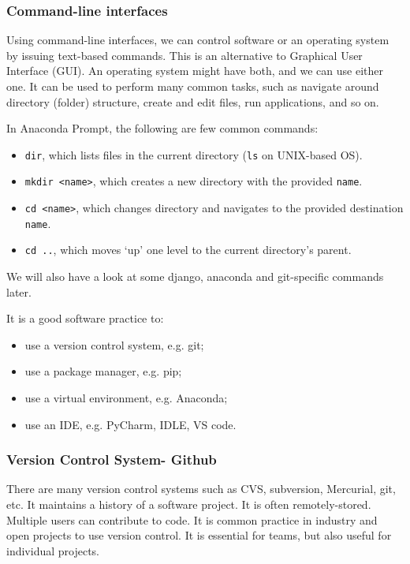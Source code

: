 \documentclass[a4paper, openany]{memoir}
\begin{document}
    \subsubsection{Command-line interfaces}
    Using command-line interfaces, we can control software or an operating system by issuing text-based commands. This is an alternative to Graphical User Interface (GUI). An operating system might have both, and we can use either one. It can be used to perform many common tasks, such as navigate around directory (folder) structure, create and edit files, run applications, and so on.

    \noindent In Anaconda Prompt, the following are few common commands:
    \begin{itemize}
        \item \texttt{dir}, which lists files in the current directory (\texttt{ls} on UNIX-based OS).
        \item \texttt{mkdir <name>}, which creates a new directory with the provided \texttt{name}.
        \item \texttt{cd <name>}, which changes directory and navigates to the provided destination \texttt{name}.
        \item \texttt{cd ..}, which moves `up' one level to the current directory's parent.
    \end{itemize}
    We will also have a look at some django, anaconda and git-specific commands later.

    \noindent It is a good software practice to:
    \begin{itemize}
        \item use a version control system, e.g. git;
        \item use a package manager, e.g. pip;
        \item use a virtual environment, e.g. Anaconda;
        \item use an IDE, e.g. PyCharm, IDLE, VS code.
    \end{itemize}

    \subsubsection{Version Control System- Github}
    There are many version control systems such as CVS, subversion, Mercurial, git, etc. It maintains a history of a software project. It is often remotely-stored. Multiple users can contribute to code. It is common practice in industry and open projects to use version control. It is essential for teams, but also useful for individual projects.
\end{document}
